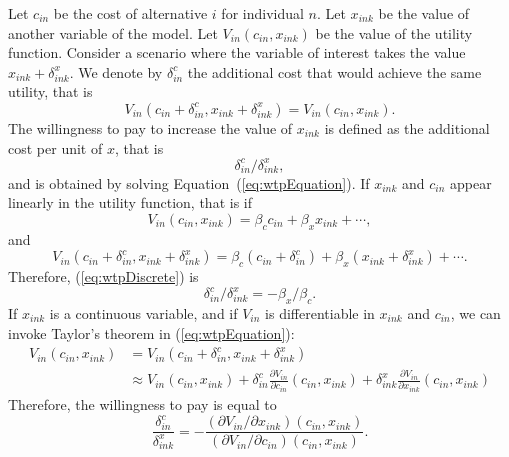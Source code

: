 \documentclass[12pt,a4paper]{article}
\newcommand{\req}[1]{(\ref{#1})}
\begin{document}
Let $c_{in}$ be the cost of alternative $i$ for individual $n$.
Let $x_{ink}$ be the value of another variable of the model. 
Let $V_{in}(c_{in},x_{ink})$ be the value of the utility function. 
Consider a scenario where the variable of interest takes the value
$x_{ink} + \delta^x_{ink}$. 
We denote by $\delta^c_{in}$ the additional  cost  that would achieve the same utility, that is
\begin{equation}
  \label{eq:wtpEquation}
V_{in}(c_{in}+\delta^c_{in},x_{ink}+\delta^x_{ink}) = V_{in}(c_{in},x_{ink}).
\end{equation}
The willingness to pay to increase the value of $x_{ink}$ is defined
as the additional cost per unit of $x$, that is 
\begin{equation}
  \label{eq:wtpDiscrete}
  \delta^c_{in}/\delta^x_{ink},
\end{equation}
and is obtained by solving Equation~\req{eq:wtpEquation}.
If $x_{ink}$ and $c_{in}$ appear linearly in the utility function, that
is if
\begin{equation}
V_{in}(c_{in},x_{ink}) = \beta_c c_{in} + \beta_x x_{ink} + \cdots,
\end{equation}
and
\begin{equation}
V_{in}(c_{in}+\delta^c_{in},x_{ink}+\delta^x_{ink}) = \beta_c (c_{in}+\delta^c_{in}) + \beta_x (x_{ink}+\delta^x_{ink}) + \cdots.
\end{equation}
Therefore, \req{eq:wtpDiscrete} is
\begin{equation}
  \label{eq:wtpLinear}
  \delta^c_{in}/\delta^x_{ink} = -\beta_x / \beta_c.
\end{equation}
If $x_{ink}$ is a continuous variable, and if $V_{in}$ is
differentiable in $x_{ink}$ and $c_{in}$, we can invoke  Taylor's
theorem in \req{eq:wtpEquation}:
\begin{equation}
\begin{aligned}
V_{in}(c_{in},x_{ink})&= V_{in}(c_{in}+\delta^c_{in},x_{ink}+\delta^x_{ink})\\ &\approx V_{in}(c_{in},x_{ink}) + \delta^c_{in} \frac{\partial V_{in}}{\partial c_{in}}(c_{in},x_{ink})+ \delta^x_{ink} \frac{\partial V_{in}}{\partial x_{ink}}(c_{in},x_{ink})
\end{aligned}
\end{equation}
Therefore, the willingness to pay is equal to 
\begin{equation}
  \label{eq:wtpContinuous}
\frac{\delta^c_{in}}{ \delta^x_{ink}} = - \frac{(\partial V_{in}/\partial x_{ink})(c_{in},x_{ink})}{(\partial V_{in}/\partial c_{in})(c_{in},x_{ink})}.
\end{equation}
\end{document}
